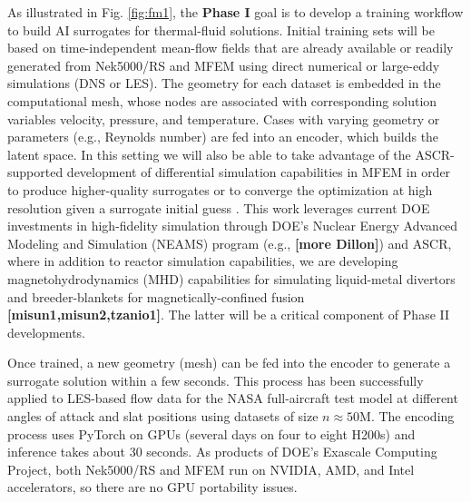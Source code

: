 


As illustrated in Fig. \ref{fig:fm1}, the {\bf Phase I} goal is to develop a training
workflow to build AI surrogates for thermal-fluid solutions.   Initial
training sets will be based on time-independent {mean-flow} fields that are already
available or readily generated from Nek5000/RS and MFEM using direct numerical
or large-eddy simulations (DNS or LES).  The geometry for each dataset is embedded
in the computational mesh, whose nodes are associated with corresponding
solution variables velocity, pressure, and temperature.   Cases with
varying geometry or parameters (e.g., Reynolds number) are fed into an
encoder, which builds the latent space. In this setting we will also be able to
take advantage of the ASCR-supported development of differential simulation
capabilities in MFEM in order to produce higher-quality surrogates or to
converge the optimization at high resolution given a surrogate initial guess
\cite{MFEM24, DMC24, Schmidt26}.    
%
This work leverages current DOE investments in high-fidelity simulation
through DOE's Nuclear Energy Advanced Modeling and Simulation (NEAMS) program
(e.g., \cite{smr21,Merzari2024Exascale} {\bf [more Dillon]}) and ASCR,
where in addition to reactor simulation capabilities, we are developing
magnetohydrodynamics (MHD) capabilities for simulating liquid-metal divertors
and breeder-blankets for magnetically-confined fusion {\bf [misun1,misun2,tzanio1]}.
The latter will be a critical component of Phase II developments.

Once trained, a new geometry (mesh) can be fed into the encoder to generate a
surrogate solution within a few seconds.  This process has been successfully
applied to LES-based flow data for the NASA full-aircraft test model at
different angles of attack and slat positions using datasets of size $n \approx
50$M.  The encoding process uses PyTorch on GPUs (several days on four to eight
H200s) and inference takes about 30 seconds.  As products of DOE's Exascale
Computing Project, both Nek5000/RS and MFEM run on NVIDIA, AMD, and Intel
accelerators, so there are no GPU portability issues.

